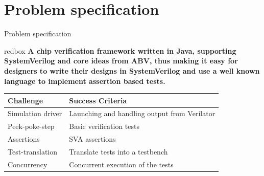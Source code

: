 \documentclass[aspectratio=169, handout]{beamer}
\begin{document}
\section{Problem specification}
\begin{frame}{Problem specification}
    \begin{center}
        \begin{beamercolorbox}[sep=2em]{redbox}
            \textbf{A chip verification framework written in Java, supporting SystemVerilog and core ideas from ABV, thus making it easy for designers to write their designs in SystemVerilog and use a well known language to implement assertion based tests.}
        \end{beamercolorbox}
        \begin{tabular}{ll}
            \toprule
            Challenge         & Success Criteria                             \\
            \midrule
            Simulation driver & Launching and handling output from Verilator \\
            Peek-poke-step    & Basic verification tests                     \\
            Assertions        & SVA assertions                               \\
            Test-translation  & Translate tests into a testbench             \\
            Concurrency       & Concurrent execution of the tests            \\
            \bottomrule
        \end{tabular}
    \end{center}
\end{frame}
\end{document}
